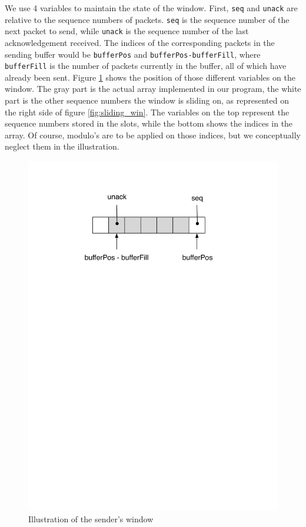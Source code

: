 \documentclass[11pt,a4paper,titlepage]{article}
\begin{document}
We use 4 variables to maintain the state of the window. First, \texttt{seq} and \texttt{unack} are relative to the sequence numbers of packets. \texttt{seq} is the sequence number of the next packet to send, while \texttt{unack} is the sequence number of the last acknowledgement received. The indices of the corresponding packets in the sending buffer would be \texttt{bufferPos} and \texttt{bufferPos-bufferFill}, where \texttt{bufferFill} is the number of packets currently in the buffer, all of which have already been sent.
Figure \ref{fig:sending_win} shows the position of those different variables on the window. The gray part is the actual array implemented in our program, the white part is the other sequence numbers the window is sliding on, as represented on the right side of figure \ref{fig:sliding_win}. The variables on the top represent the sequence numbers stored in the slots, while the bottom shows the indices in the array. Of course, modulo's are to be applied on those indices, but we conceptually neglect them in the illustration.
\begin{figure}[!ht]
	\centering
	\includegraphics[width=.4\textwidth]{figure/sending_buf.pdf}
	\caption{\label{fig:sending_win} Illustration of the sender's window}
\end{figure}
\end{document}
